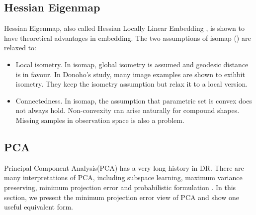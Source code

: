 \subsection{Hessian Eigenmap}
\label{sec:hemap}

Hessian Eigenmap, also called Hessian Locally Linear Embedding
\cite{donoho2003hessian}, is shown to have theoretical 
advantages in embedding. The two assumptions of isomap
(\rsec{\ref{sec:isomap}}) are relaxed to:
\begin{itemize}
	\item Local isometry. In isomap, global isometry is assumed 
	and geodesic distance is in favour. In Donoho's study, 
	many image examples are shown to exihbit isometry\cite{donoho2003hessian}. 
	They keep the isometry assumption but relax it to a local version. 
	\item Connectedness. In isomap, the assumption that 
	parametric set is convex does not always hold. Non-convexity
	can arise naturally for compound shapes. Missing samples 
	in observation space is also a problem. 
\end{itemize} 

\subsection{PCA}
\label{sec:pca}

Principal Component Analysis(PCA)\cite{bishop2006pattern} has a very long history in 
DR. There are many interpretations of PCA, including 
subspace learning, maximum variance preserving, 
minimum projection error and probabilistic formulation
\cite{tipping1999probabilistic}. In this section, we present 
the minimum projection error view of PCA and show one useful equivalent
form. 

